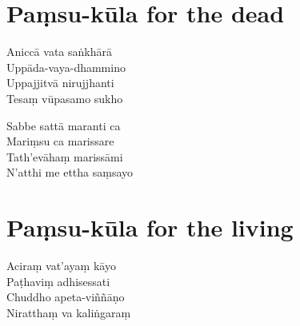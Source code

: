 \clearpage

\chapter{Paṃsu-kūla for the dead}%


\begin{paritta}
Aniccā vata saṅkhārā\\
Uppāda-vaya-dhammino\\
Uppajjitvā nirujjhanti\\
Tesaṃ vūpasamo sukho

Sabbe sattā maranti ca\\
Mariṃsu ca marissare\\
Tath'evāhaṃ marissāmi\\
N'atthi me ettha saṃsayo


\end{paritta}

\chapter{Paṃsu-kūla for the living}%


\begin{paritta}
Aciraṃ vat'ayaṃ kāyo\\
Paṭhaviṃ adhisessati\\
Chuddho apeta-viññāṇo\\
Niratthaṃ va kaliṅgaraṃ


\end{paritta}

